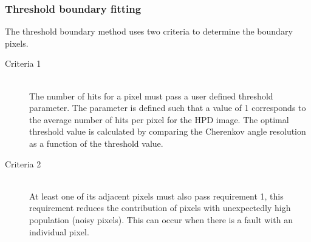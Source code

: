 \subsubsection{Threshold boundary fitting}

The threshold boundary method uses two criteria to determine the boundary pixels.

\begin{description}
	\item[Criteria 1] \hfill \\ The number of hits for a pixel must pass a user defined threshold parameter. The parameter is defined such that a value of 1 corresponds to the average number of hits per pixel for the HPD image. The optimal threshold value is calculated by comparing the Cherenkov angle resolution as a function of the threshold value.
	\item[Criteria 2] \hfill \\ At least one of its adjacent pixels must also pass requirement 1, this requirement reduces the contribution of pixels with unexpectedly high population (noisy pixels). This can occur when there is a fault with an individual pixel.
\end{description}




